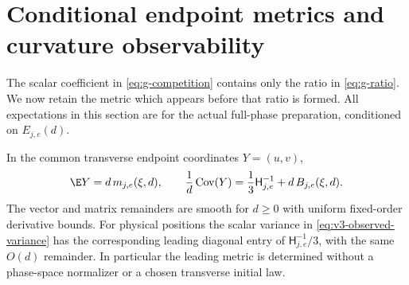 \section{Conditional endpoint metrics and curvature observability}
\label{sec:v3-observability}
The scalar coefficient in \eqref{eq:g-competition} contains only the
ratio in \eqref{eq:g-ratio}. We now retain the metric which appears
before that ratio is formed. All expectations in this section are for
the actual full-phase preparation, conditioned on $E_{j,e}(d)$.

\begin{proposition}\label{prop:v3-metric}
In the common transverse endpoint coordinates $Y=(u,v)$,
\begin{equation}\label{eq:v3-metric-law}
 \E Y=d\,m_{j,e}(\xi,d),\qquad
 \frac1d\operatorname{Cov}(Y)
    =\frac13\mathsf H_{j,e}^{-1}+d\,B_{j,e}(\xi,d).
\end{equation}
The vector and matrix remainders are smooth for $d\ge0$ with uniform
fixed-order derivative bounds. For physical positions the scalar
variance in \eqref{eq:v3-observed-variance} has the corresponding
leading diagonal entry of $\mathsf H_{j,e}^{-1}/3$, with the same
$O(d)$ remainder. In particular the leading metric is determined
without a phase-space normalizer or a chosen transverse initial law.
\end{proposition}
